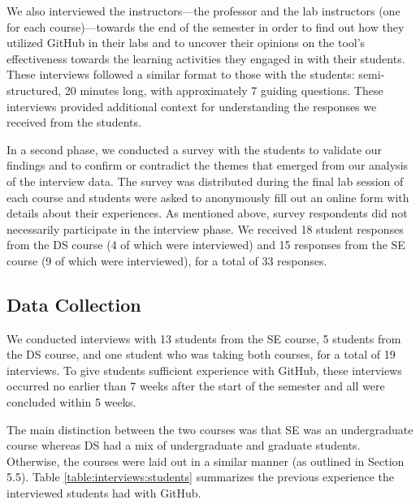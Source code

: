 We also interviewed the instructors---the professor and the lab instructors (one for each course)---towards the end of the semester in order to find out how they utilized GitHub in their labs and to uncover their opinions on the tool's effectiveness towards the learning activities they engaged in with their students. These interviews followed a similar format to those with the students: semi-structured, 20 minutes long, with approximately 7 guiding questions. These interviews provided additional context for understanding the responses we received from the students.

In a second phase, we conducted a survey with the students to validate our findings and to confirm or contradict the themes that emerged from our analysis of the interview data. The survey was distributed during the final lab session of each course and students were asked to anonymously fill out an online form with details about their experiences. As mentioned above, survey respondents did not necessarily participate in the interview phase. We received 18 student responses from the DS course (4 of which were interviewed) and 15 responses from the SE course (9 of which were interviewed), for a total of 33 responses.

\subsection{Data Collection}
We conducted interviews with 13 students from the SE course, 5 students from the DS course, and one student who was taking both courses, for a total of 19 interviews.
To give students sufficient experience with GitHub, these interviews occurred no earlier than 7 weeks after the start of the semester and all were concluded within 5 weeks.

 The main distinction between the two courses was that SE was an undergraduate course whereas DS had a mix of undergraduate and graduate students. Otherwise, the courses were laid out in a similar manner (as outlined in Section 5.5). Table \ref{table:interviews:students} summarizes the previous experience the interviewed students had with GitHub.


